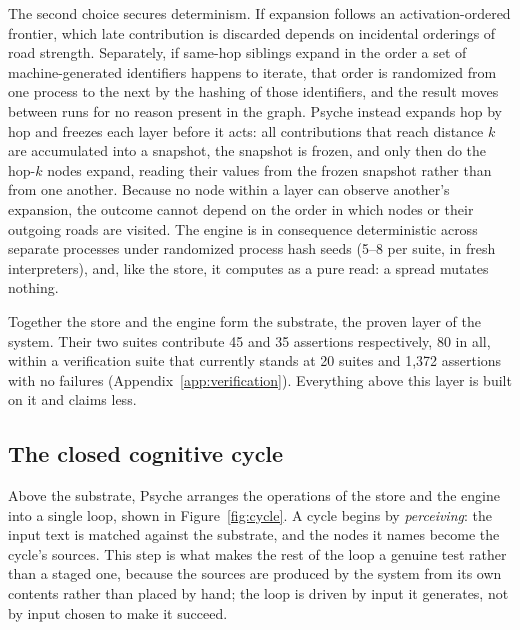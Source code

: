 \documentclass[11pt]{article}
\begin{document}
The second choice secures determinism. If expansion follows an activation-ordered
frontier, which late contribution is discarded depends on incidental orderings of road
strength. Separately, if same-hop siblings expand in the order a set of
machine-generated identifiers happens to iterate, that order is randomized from one
process to the next by the hashing of those identifiers, and the result moves between
runs for no reason present in the graph. Psyche instead expands hop by hop and freezes each layer before
it acts: all contributions that reach distance $k$ are accumulated into a snapshot,
the snapshot is frozen, and only then do the hop-$k$ nodes expand, reading their values
from the frozen snapshot rather than from one another. Because no node within a layer
can observe another's expansion, the outcome cannot depend on the order in which nodes
or their outgoing roads are visited. The engine is in consequence deterministic across
separate processes under randomized process hash seeds (5--8 per suite, in fresh
interpreters), and, like the store, it computes as a pure read: a spread mutates
nothing.

Together the store and the engine form the substrate, the proven layer of the system.
Their two suites contribute 45 and 35 assertions respectively, 80 in all, within a
verification suite that currently stands at 20 suites and 1,372 assertions with no
failures (Appendix~\ref{app:verification}). Everything above this layer is built on it
and claims less.

\subsection{The closed cognitive cycle}

Above the substrate, Psyche arranges the operations of the store and the engine into a
single loop, shown in Figure~\ref{fig:cycle}. A cycle begins by \emph{perceiving}: the
input text is matched against the substrate, and the nodes it names become the cycle's
sources. This step is what makes the rest of the loop a genuine test rather than a staged one,
because the sources are produced by the system from its own contents rather than placed
by hand; the loop is driven by input it generates, not by input chosen to make it
succeed.
\end{document}
